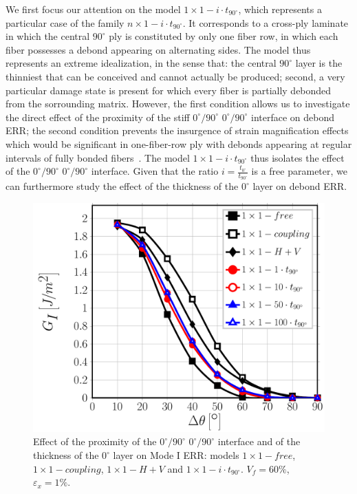 \documentclass[review]{elsarticle}
\begin{document}
We first focus our attention on the model $1\times 1-i\cdot t_{90^{\circ}}$, which represents a particular case of the family $n\times 1-i\cdot t_{90^{\circ}}$. It corresponds to a cross-ply laminate in which the central $90^{\circ}$ ply is constituted by only one fiber row, in which each fiber possesses a debond appearing on alternating sides. The model thus represents an extreme idealization, in the sense that: the central $90^{\circ}$ layer is the thinniest that can be conceived and cannot actually be produced; second, a very particular damage state is present for which every fiber is partially debonded from the sorrounding matrix. However, the first condition allows us to investigate the direct effect of the proximity of the stiff $0^{\circ}/90^{\circ}$ $0^{\circ}/90^{\circ}$ interface on debond ERR; the second condition prevents the insurgence of strain magnification effects which would be significant in one-fiber-row ply with debonds appearing at regular intervals of fully bonded fibers~\cite{DiStasio2019}. The model $1\times 1-i\cdot t_{90^{\circ}}$ thus isolates the effect of the $0^{\circ}/90^{\circ}$ $0^{\circ}/90^{\circ}$ interface. Given that the ratio $i=\frac{t_{0^{\circ}}}{t_{90^{\circ}}}$ is a free parameter, we can furthermore study the effect of the thickness of the $0^{\circ}$ layer on debond ERR.

\begin{figure}[!h]
\centering
\includegraphics[width=\textwidth]{1x1-i-vf60-GI.pdf}
\caption{Effect of the proximity of the $0^{\circ}/90^{\circ}$ $0^{\circ}/90^{\circ}$ interface and of the thickness of the $0^{\circ}$ layer on Mode I ERR: models $1\times 1-free$, $1\times 1-coupling$, $1\times 1-H+V$ and $1\times 1-i\cdot t_{90^{\circ}}$. $V_{f}=60\%$, $\varepsilon_{x}=1\%$.}\label{fig:thicknessGI}
\end{figure}
\end{document}
